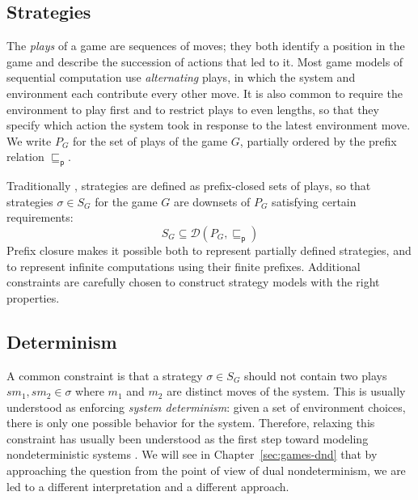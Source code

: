 \documentclass[11pt,oneside,draft]{book}
\theoremstyle{definition}
\newcommand{\kw}[1]{\ensuremath{ \mathsf{#1} }}
\newcommand{\pref}{\sqsubseteq_\kw{p}}  %
\begin{document}

\subsection{Strategies} \label{sec:bg:strat} %

The \emph{plays} of a game are sequences of moves;
they both identify a position in the game
and describe the succession of actions that led to it.
Most game models of sequential computation
use \emph{alternating} plays,
in which
the system and environment each contribute
every other move.
It is also common to require the environment to play first
and to restrict plays to even lengths,
so that they specify which action the system took
in response to the latest environment move.
We write $P_G$ for the set of plays of the game $G$,
partially ordered by the prefix relation $\pref$.

Traditionally \citep{gamesem99},
strategies are defined as
prefix-closed sets of plays,
so that strategies $\sigma \in S_G$
for the game $G$ are downsets of $P_G$
satisfying certain requirements:
\[
    S_G \subseteq
    \mathcal{D}(P_G, {\pref})
\]
Prefix closure makes it possible both
to represent partially defined strategies,
and to represent infinite computations
using their finite prefixes.
Additional constraints
are carefully chosen to construct
strategy models
with the right properties.

\subsection{Determinism}

A common constraint is that a strategy $\sigma \in S_G$
should not contain two plays $s m_1, s m_2 \in \sigma$
where $m_1$ and $m_2$ are distinct moves of the system.
This is usually understood as
enforcing \emph{system determinism}:
given a set of environment choices,
there is only one possible behavior for the system.
Therefore,
relaxing this constraint has usually been understood
as the first step toward modeling nondeterministic systems
\citep{gsfnd}.
We will see in Chapter~\ref{sec:games-dnd}
that by approaching the question
from the point of view of dual nondeterminism,
we are led to a different interpretation and a different approach.

%
\end{document}
